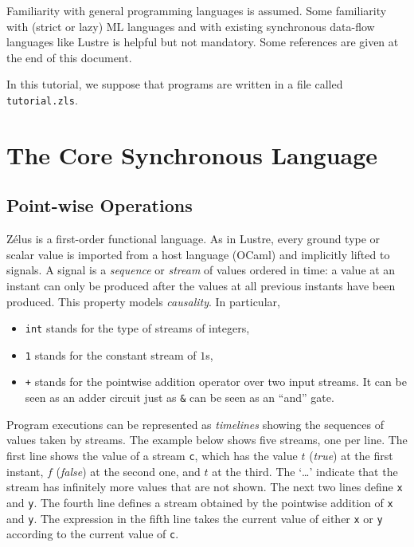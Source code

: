 \documentclass[11pt,titlepage,twoside]{report}
\makeatletter
\newcommand{\zls}[1]{{\@span{class="zelusinline"}#1}}
\newcommand{\zls}[1]{\texttt{#1}}
\renewcommand{\zls}[1]{\texttt{#1}}
\newcommand{\f}{$f$}
\renewcommand{\t}{$t$}
\newcommand{\zelus}{{\sf Z\'elus}}
\newcommand{\lustre}{{\sf Lustre}}
\newcommand{\ocaml}{{\sf OCaml}}
\makeatother
\begin{document}
Familiarity with general programming languages is assumed.
Some familiarity with (strict or lazy) ML
languages and with existing synchronous data-flow languages like \lustre{} is
helpful but not mandatory. Some references are given at the end of this document.

In this tutorial, we suppose that programs are written in a file called
\verb-tutorial.zls-.%

\section{The Core Synchronous Language\label{coresync}} %

\subsection{Point-wise Operations\label{pointwise}} %

\zelus{} is a first-order functional language. As in \lustre,
every ground type or scalar value is imported from a host language
(\ocaml{}) and implicitly lifted to signals. A signal is a
\emph{sequence} or \emph{stream} of values ordered in time:
a value at an instant can only be produced after the values at all previous 
instants have been produced. This property
models \emph{causality}. In particular,
\begin{itemize}
\item \verb-int- stands for the type of streams of integers,
\item \verb-1- stands for the constant stream of $1$s,
\item \verb-+- stands for the pointwise addition operator over two input 
streams. It can be seen as an adder circuit just as \verb-&- can be seen as an
  ``and'' gate.
\end{itemize}
Program executions can be represented as \emph{timelines} showing the 
sequences of values taken by streams. The
example below shows five streams, one per line. The first line shows
the value of a stream \zls{c}, which has the value \t{} ({\em true}) at the 
first instant, \f{} ({\em false}) at the second one, and \t{} at the
third. The `\dots' indicate that the stream has infinitely more values that 
are not shown. The next two lines define \zls{x} and \zls{y}. The fourth 
line defines a stream obtained
by the pointwise addition of \zls{x} and \zls{y}.
The expression in the fifth line takes the current value of either \zls{x} 
or \zls{y} according to the current value of \zls{c}.
\end{document}
